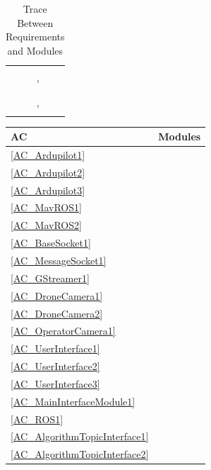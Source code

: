 \documentclass[12pt, titlepage]{article}
\begin{document}
\begin{table}[H]
\begin{tabular}{p{} p{}}
\nameref{SR_008}&  \\
\nameref{SR_009}&  \nameref{User Interface}, \nameref{Vision App} \\
\nameref{SR_010}&  \\
\nameref{SR_011}&  \nameref{Operation States} \\
\nameref{SR_012}&  \nameref{Operation States}, \nameref{User Interface} \\
\nameref{SR_013}&  \nameref{User Interface} \\
\bottomrule
\end{tabular}
\caption{Trace Between Requirements and Modules}
\end{table}

\begin{table}[H]
\centering
\begin{tabular}{p{} p{}}
\toprule
\textbf{AC} & \textbf{Modules}\\
\midrule
\ref{AC_Ardupilot1} & \nameref{Firmware} \\
\ref{AC_Ardupilot2} & \nameref{Firmware} \\
\ref{AC_Ardupilot3} & \nameref{Firmware} \\
\ref{AC_MavROS1} & \nameref{MavROS} \\
\ref{AC_MavROS2} & \nameref{MavROS} \\
\ref{AC_BaseSocket1} & \nameref{Base Socket} \\
\ref{AC_MessageSocket1} & \nameref{Message Socket} \\
\ref{AC_GStreamer1} & \nameref{Video Streamer} \\
\ref{AC_DroneCamera1} & \nameref{Drone Camera} \\
\ref{AC_DroneCamera2} & \nameref{Drone Camera} \\
\ref{AC_OperatorCamera1} & \nameref{Operator Camera} \\
\ref{AC_UserInterface1} & \nameref{User Interface} \\
\ref{AC_UserInterface2} & \nameref{User Interface} \\
\ref{AC_UserInterface3} & \nameref{User Interface} \\
\ref{AC_MainInterfaceModule1} & \nameref{Main Interface Module} \\
\ref{AC_ROS1} & \nameref{ROS} \\
\ref{AC_AlgorithmTopicInterface1} & \nameref{Algorithm Topic Interface} \\
\ref{AC_AlgorithmTopicInterface2} & \nameref{Algorithm Topic Interface} \\

\end{tabular}
\end{table}
\end{document}
